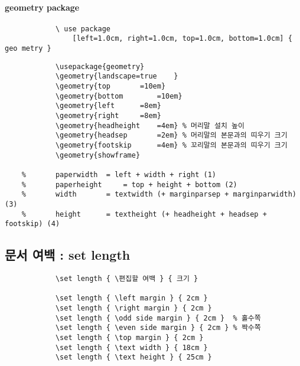 	\paragraph{ geometry package} \hfill

		\begin{boxedminipage}[c]{1.0\linewidth}
			\begin{verbatim}
			\ use package 
				[left=1.0cm, right=1.0cm, top=1.0cm, bottom=1.0cm] { geo metry }
			\end{verbatim}
		\end{boxedminipage}

		\begin{mdframed}[style=code_document, frametitle={code}]
			\begin{verbatim}
			\usepackage{geometry}
			\geometry{landscape=true	}
			\geometry{top 		=10em}
			\geometry{bottom		=10em}
			\geometry{left		=8em}
			\geometry{right		=8em}
			\geometry{headheight	=4em} % 머리말 설치 높이
			\geometry{headsep		=2em} % 머리말의 본문과의 띠우기 크기
			\geometry{footskip		=4em} % 꼬리말의 본문과의 띠우기 크기
	 		\geometry{showframe}
		
	%		paperwidth 	= left + width + right (1)
	%		paperheight 	= top + height + bottom (2)
	%		width 		= textwidth (+ marginparsep + marginparwidth) (3)
	%		height 		= textheight (+ headheight + headsep + footskip) (4)
			\end{verbatim}
		\end{mdframed}





	\newpage  
	\subsection*{문서 여백 : set length }

		\singlespacing
		\setlength{\fboxsep}{12pt}
		\begin{boxedminipage}[c]{1.0\linewidth}
			\begin{verbatim}
			\set length { \편집할 여백 } { 크기 }
			
			\set length { \left margin } { 2cm }
			\set length { \right margin } { 2cm }
			\set length { \odd side margin } { 2cm }  % 홀수쪽
			\set length { \even side margin } { 2cm } % 짝수쪽
			\set length { \top margin } { 2cm }
			\set length { \text width } { 18cm }
			\set length { \text height } { 25cm }
			\end{verbatim} 
		\end{boxedminipage}
		\doublespacing

